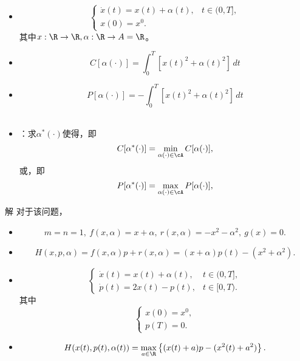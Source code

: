 \begin{frame}{\subsecname}
\begin{example}
 \begin{itemize}
 \item {}
 $$
 \left\{
 \begin{array}{lc}
      \dot x(t)=x(t)+\alpha(t), & t \in (0, T], \\[.05in]
      x(0) = x^0. & 
 \end{array}
 \right.
 $$
 其中$x:\R\to \R, \alpha:\R\to A=\R$。\\[.1in]
 \item {}
 $$
 C[\alpha(\cdot)] = \int_0^T \left[x(t)^2+\alpha(t)^2\right]\,dt
 $$
 \item {}
 $$
 P[\alpha(\cdot)] = -\int_0^T \left[x(t)^2+\alpha(t)^2\right]\,dt
 $$
 \\[.1in]
 \item {}：求$\alpha^*(\cdot)$使得，即
 $$
 C[\alpha^*(\cdot)] = \min_{\alpha(\cdot)\in \cA} C[\alpha(\cdot)],
 $$
 或，即
 $$
 P[\alpha^*(\cdot)] = \max_{\alpha(\cdot)\in \cA} P[\alpha(\cdot)],
 $$
 \end{itemize} 
\end{example}
\end{frame}


\begin{frame}{\subsecname}
\begin{block}{解}
对于该问题，
\begin{itemize}
\item {}
$$
m=n=1, ~
f(x,\alpha)=x+\alpha, ~
r(x,\alpha)=-x^2-\alpha^2, ~
g(x) = 0.
$$
\item {}
$$
H(x,p,\alpha) = f(x,\alpha) p + r(x,\alpha) = (x+\alpha) p(t) - (x^2+\alpha^2).
$$
\item {}
\begin{equation}
    \left\{
    \begin{array}{ll}
        \dot x(t) %
        = x(t)+\alpha(t),  &  t \in (0,T], \\[.1in]
        \dot p(t) %
        =2x(t)-p(t),  &  t \in [0,T). 
    \end{array}
    \right.
\end{equation}
其中 
\begin{equation}
\left\{
\begin{array}{l}
    x(0) = x^0,  \\[0.05in]
    p(T) %
    = 0.
\end{array}
\right.
\end{equation}
\item {}
$$
H(x(t),p(t),\alpha(t)) = \max_{a\in \R} \left\{(x(t)+a) p - (x^2(t)+a^2)\right\}. 
$$
\end{itemize}
\end{block}
\end{frame}

